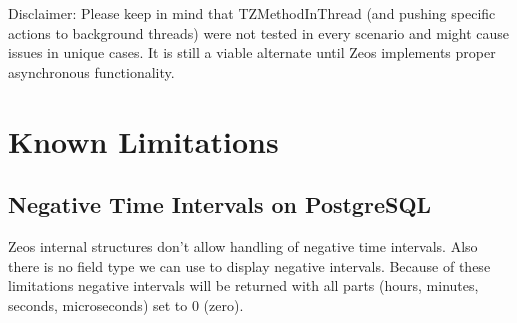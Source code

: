 \documentclass[a4paper,12pt,oneside]{report}
\begin{document}
Disclaimer:
Please keep in mind that TZMethodInThread (and pushing specific actions to background threads) were not tested in every scenario and might cause issues in unique cases.
It is still a viable alternate until Zeos implements proper asynchronous functionality.

\section{Known Limitations}

\subsection{Negative Time Intervals on PostgreSQL}
Zeos internal structures don't allow handling of negative time intervals.
Also there is no field type we can use to display negative intervals.
Because of these limitations negative intervals will be returned with all parts (hours, minutes, seconds, microseconds) set to 0 (zero).
\end{document}
